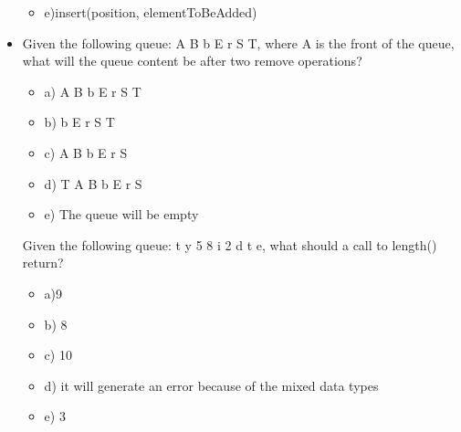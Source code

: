 \begin{itemize}
\begin{itemize}
\item e)insert(position, elementToBeAdded)
\end{itemize}





\item Given the following queue:  A B b E r S T,  where A is the front of the 
       queue,  what will the queue content be after two remove operations?
\begin{itemize}
\item a)  A B b E r S T

\item b) b E r S T

\item c) A B b E r S

\item d)  T A B b E r S

\item e) The queue will be empty

\end{itemize}




Given the following queue: t y 5 8 i 2 d t e,  what should a call to 
       length() return?
\begin{itemize}
\item a)9

\item b) 8

\item c) 10

\item d) it will generate an error because of the mixed data types

\item e) 3
\end{itemize}

\end{itemize}
